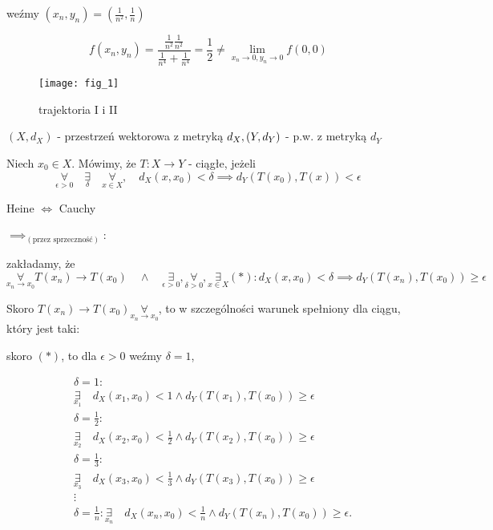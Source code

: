 \documentclass[../main.tex]{subfiles}
\begin{document}
weźmy $(x_{n},y_{n}) = (\frac{1}{n^{2}},\frac{1}{n})$

$$f(x_{n},y_{n}) = \frac{\frac{1}{n^{2}} \frac{1}{n^{2}}}{\frac{1}{n^{4}}+\frac{1}{n^{4}}} = \frac{1}{2} \neq \lim\limits_{x_{n}\to 0, y_{n}\to 0} f(0,0)$$

\begin{figure}
    \centering
    \begin{center}
        \texttt{[image: fig\_1]}
    \end{center}
    \caption{trajektoria I i II}
\end{figure}

$(X,d_{X})$ - przestrzeń wektorowa z metryką $d_{X},\\ (Y,d_{Y})$ - p.w. z metryką $d_{Y}$

Niech $x_{0}\in X$. Mówimy, że $T: X\to Y$ - ciągłe, jeżeli
$$\underset{\epsilon > 0}{\forall} \quad\underset{\delta}{\exists} \quad\underset{x\in X}{\forall}, \quad d_{X} (x,x_{0}) < \delta \implies d_{Y} (T(x_{0}), T(x)) < \epsilon$$

\begin{dowod}
    Heine $\iff$ Cauchy
\end{dowod}

\begin{large}
    $\implies_{(\text{przez sprzeczność})}$:
\end{large}
\vspace{0.5cm}

zakładamy, że $$\underset{x_n \to x_0}{\forall} T(x_{n}) \to T(x_{0}) \quad\land\quad \underset{\epsilon > 0}{\exists}, \underset{\delta > 0}{\forall}, \underset{x\in X}{\exists} (*): d_{X} (x,x_{0}) < \delta \implies d_{Y} (T(x_{n}),T(x_{0})) \geq \epsilon$$

Skoro $T(x_{n})\to T(x_{0}) \underset{x_n \to x_0}{\forall}$, to w szczególności warunek spełniony dla ciągu, który jest taki:

\vspace{0.3cm}
skoro $(*)$, to dla $\epsilon>0$ weźmy $\delta = 1$,

\begin{align*}
    &\delta=1:\\
    &\underset{x_1}{\exists} \quad d_{X} (x_{1},x_{0})<1 \land d_{Y} (T(x_{1}), T(x_{0})) \geq \epsilon \\
    &\delta=\frac{1}{2}:\\
    &\underset{x_2}{\exists} \quad d_{X} (x_{2},x_{0})<\frac{1}{2} \land d_{Y} (T(x_{2}), T(x_{0})) \geq \epsilon \\
    &\delta=\frac{1}{3}:\\
    &\underset{x_3}{\exists} \quad d_{X} (x_{3},x_{0})<\frac{1}{3} \land d_{Y} (T(x_{3}), T(x_{0})) \geq \epsilon\\
    &\vdots\\
    &\delta=\frac{1}{n}: \underset{x_n}{\exists} \quad d_{X}(x_{n},x_{0}) < \frac{1}{n} \land d_{Y} (T(x_{n}),T(x_{0})) \geq \epsilon
.\end{align*}
\end{document}
